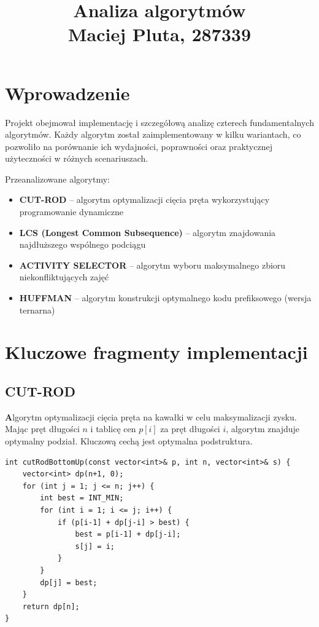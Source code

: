\documentclass[11pt,a4paper]{article}
\title{\textbf{Analiza algorytmów}\\
\vspace{0.3cm}
\large Maciej Pluta, 287339}
\date{}
\begin{document}
\maketitle


\section{Wprowadzenie}
Projekt obejmował implementację i szczegółową analizę czterech fundamentalnych algorytmów. Każdy algorytm został zaimplementowany w kilku wariantach, co pozwoliło na porównanie ich wydajności, poprawności oraz praktycznej użyteczności w różnych scenariuszach.

Przeanalizowane algorytmy:
\begin{itemize}[itemsep=2pt, topsep=2pt]
    \item \textbf{CUT-ROD} – algorytm optymalizacji cięcia pręta wykorzystujący programowanie dynamiczne
    \item \textbf{LCS (Longest Common Subsequence)} – algorytm znajdowania najdłuższego wspólnego podciągu
    \item \textbf{ACTIVITY SELECTOR} – algorytm wyboru maksymalnego zbioru niekonfliktujących zajęć
    \item \textbf{HUFFMAN} – algorytm konstrukcji optymalnego kodu prefiksowego (wersja ternarna)
\end{itemize}


\section{Kluczowe fragmenty implementacji}

\subsection{CUT-ROD}
\textbf Algorytm optymalizacji cięcia pręta na kawałki w celu maksymalizacji zysku. Mając pręt długości $n$ i tablicę cen $p[i]$ za pręt długości $i$, algorytm znajduje optymalny podział. Kluczową cechą jest optymalna podstruktura.

\begin{lstlisting}[caption={CUT-ROD – wersja Bottom-Up}]
int cutRodBottomUp(const vector<int>& p, int n, vector<int>& s) {
    vector<int> dp(n+1, 0);
    for (int j = 1; j <= n; j++) {
        int best = INT_MIN;
        for (int i = 1; i <= j; i++) {
            if (p[i-1] + dp[j-i] > best) {
                best = p[i-1] + dp[j-i];
                s[j] = i;
            }
        }
        dp[j] = best;
    }
    return dp[n];
}
\end{lstlisting}
\end{document}
